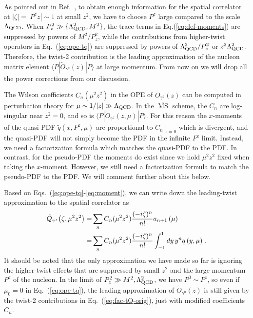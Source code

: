 As pointed out in Ref.~\cite{Ji:2017rah}, to obtain enough information for the spatial correlator at $|\zeta|= |P^z z|\sim 1$ at small $z^2$, we have to choose $P^z$ large compared to the scale $\Lambda_{\rm QCD}$. When $P_z^2\gg\{\Lambda_{\rm QCD}^2, M^2\}$, the trace terms in Eq.(\ref{eq:def-moments}) are suppressed by powers of $M^2/P_z^2$, while the contributions from higher-twist operators in Eq.~(\ref{eq:ope-tq}) are suppressed by powers of $\Lambda_{\rm QCD}^2/P_z^2$ or $z^2\Lambda_{\rm QCD}^2$. Therefore, the twist-2 contribution is the leading approximation of the nucleon matrix element $\langle P|\tilde{O}_{\gamma^z}(z)|P\rangle$ at large momentum. From now on we will drop all the power corrections from our discussion.


The Wilson coefficients $C_n ({\mu}^2 z^2)$ in the OPE of $\tilde{O}_{\gamma^z}(z)$ can be computed in perturbation theory for $\mu\sim 1/|z|\gg \Lambda_{\rm QCD}$. In
the $\overline{\ensuremath{\operatorname{MS}}}$ scheme, the $C_n$ are log-singular near $z^2 =
0$, and so is $\langle P|\tilde{O}_{\gamma^z}(z,\mu)|P\rangle$. For this reason the $x$-moments of the quasi-PDF $\tilde q(x,P^z,\mu)$ are proportional to $C_n|_{z=0}$ which is
divergent, and the quasi-PDF will not simply become the PDF in the infinite $P^z$ limit. Instead, we need a factorization formula which matches the quasi-PDF to the PDF. In contrast, for the pseudo-PDF the moments do exist since we hold $\mu^2 z^2$ fixed when taking the $x$-moment. However, we still need a factorization formula to match the pseudo-PDF to the PDF.  We will comment further about this below.

Based on Eqs.~(\ref{eq:ope-tq}-\ref{eq:moment}), we can write down the leading-twist approximation to the spatial correlator as
\begin{align} \label{eq:fac-tQ-orig}
\tilde{Q}_{\gamma^z} \bigl(\zeta, {\mu}^2 z^2\bigr)
=&  \sum_{n} C_n ({\mu}^2 z^2)  \frac{(-i \zeta)^n}{n!} a_{n + 1}
 \left(\mu\right)
 \\
= & \sum_{n} C_n (\mu^2z^2)
\frac{(-i \zeta)^n}{n!}  \int_{-1}^1 dy\,y^n q \left( y, \mu\right)
 \,.  \nonumber
\end{align}
It should be noted that the only approximation we have made so far is ignoring
the higher-twist effects that are suppressed by small $z^2$ and the large momentum $P^z$ of the nucleon. In the limit of $P_z^2\gg M^2,\Lambda_{\rm QCD}^2$, we have $P^0\sim P^z$, so even if $\mu_0=0$ in Eq.~(\ref{eq:ope-tq}), the leading approximation of $\tilde{O}_{\gamma^0}(z)$ is still given by the twist-2 contributions in Eq.~(\ref{eq:fac-tQ-orig}), just with modified coefficients $C_n$.

